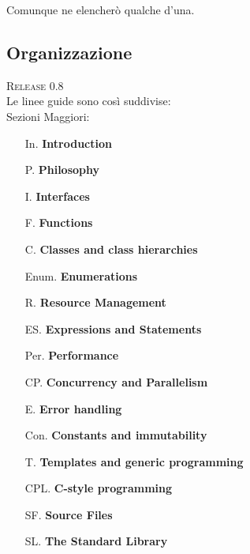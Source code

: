 \textsf{\small Comunque ne elencherò qualche d'una. } \\

\subsection{Organizzazione} %

\textsc{\footnotesize Release 0.8} \\

\textsf{Le linee guide sono così suddivise: } \\

\textsf{Sezioni Maggiori: } \\ %

\begin{multicols}{2}
	\begin{itemize}
		\item[In.] \textsf{\small \textbf{Introduction} }
		\item[P.] \textsf{\small \textbf{Philosophy} }
		\item[I.] \textsf{\small \textbf{Interfaces} }
		\item[F.] \textsf{\small \textbf{Functions} }
		\item[C.] \textsf{\small \textbf{Classes and class hierarchies} }
		\item[Enum.] \textsf{\small \textbf{Enumerations} }
		\item[R.] \textsf{\small \textbf{Resource Management} }
		\item[ES.] \textsf{\small \textbf{Expressions and Statements} }
		\item[Per.] \textsf{\small \textbf{Performance} }
		\item[CP.] \textsf{\small \textbf{Concurrency and Parallelism} }
		\item[E.] \textsf{\small \textbf{Error handling} }
		\item[Con.] \textsf{\small \textbf{Constants and immutability} }
		\item[T.] \textsf{\small \textbf{Templates and generic programming} }
		\item[CPL.] \textsf{\small \textbf{C-style programming} }
		\item[SF.] \textsf{\small \textbf{Source Files} }
		\item[SL.] \textsf{\small \textbf{The Standard Library} }
	\end{itemize}
\end{multicols}

